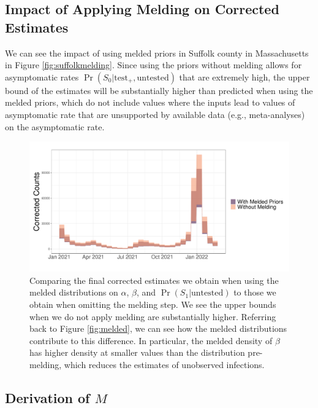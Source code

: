 \documentclass[12pt,twoside]{smiththesis}
\begin{document}
\hypertarget{impact-of-applying-melding-on-corrected-estimates}{%
\subsection{Impact of Applying Melding on Corrected Estimates}\label{impact-of-applying-melding-on-corrected-estimates}}

We can see the impact of using melded priors in Suffolk county in Massachusetts in Figure \ref{fig:suffolkmelding}. Since using the priors without melding allows for asymptomatic rates \(\Pr(S_0|\text{test}_+,\text{untested})\) that are extremely high, the upper bound of the estimates will be substantially higher than predicted when using the melded priors, which do not include values where the inputs lead to values of asymptomatic rate that are unsupported by available data (e.g., meta-analyses) on the asymptomatic rate.
\begin{figure}

{\centering \includegraphics[width=1\linewidth]{figure/suffolk_bayesian_melding} 

}

\caption{\label{fig:suffolkmelding}Comparing the final corrected estimates we obtain when using the melded distributions on $\alpha$, $\beta$, and $\Pr(S_1|\text{untested})$ to those we obtain when omitting the melding step. We see the upper bounds when we do not apply melding are substantially higher. Referring back to Figure \ref{fig:melded}, we can see how the melded distributions contribute to this difference. In particular, the melded density of $\beta$ has higher density at smaller values than the distribution pre-melding, which reduces the estimates of unobserved infections.}\label{fig:unnamed-chunk-21}
\end{figure}
\hypertarget{derivation}{%
\subsection{\texorpdfstring{Derivation of \(M\)}{Derivation of M}}\label{derivation}}
\end{document}
